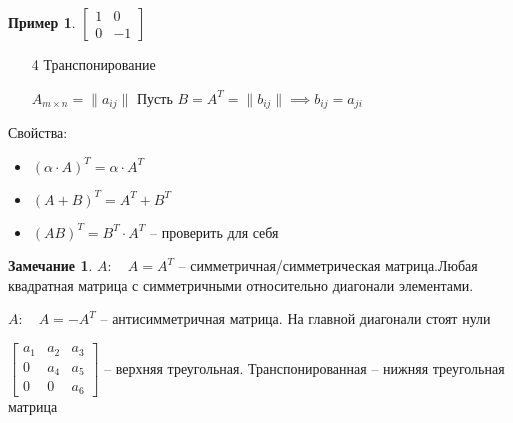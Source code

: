 \documentclass{book}
\theoremstyle{definition}
\newtheorem*{note}{Замечание}
\newtheorem*{example}{Пример}
\begin{document}
    \begin{example}
        $\begin{bmatrix} 1&0\\0&-1 \end{bmatrix} $
    \end{example}

    \begin{enumerate}
        \item [4] Транспонирование

            $A_{m\times n} = \| a_{ij} \|   $ Пусть $B = A^T = \| b_{ij} \| \implies  b_{ij} = a_{ji}$
    \end{enumerate}

    Свойства:
    \begin{itemize}
        \item $\left( \alpha \cdot A \right)^T = \alpha\cdot A^T $
        \item $(A+B)^T = A^T + B^T$
        \item $(AB)^T = B^T\cdot A^T$ -- проверить для себя
    \end{itemize}

    \begin{note}
        $A:\quad A=A^T$ -- симметричная/симметрическая матрица.Любая квадратная матрица с симметричными относительно диагонали элементами.

        $A:\quad A = -A^T$ -- антисимметричная матрица. На главной диагонали стоят нули

        $\begin{bmatrix} a_1&a_2&a_3\\ 0&a_4&a_5\\0&0&a_6 \end{bmatrix} $ -- верхняя треугольная. Транспонированная -- нижняя треугольная матрица
    \end{note}
\end{document}

